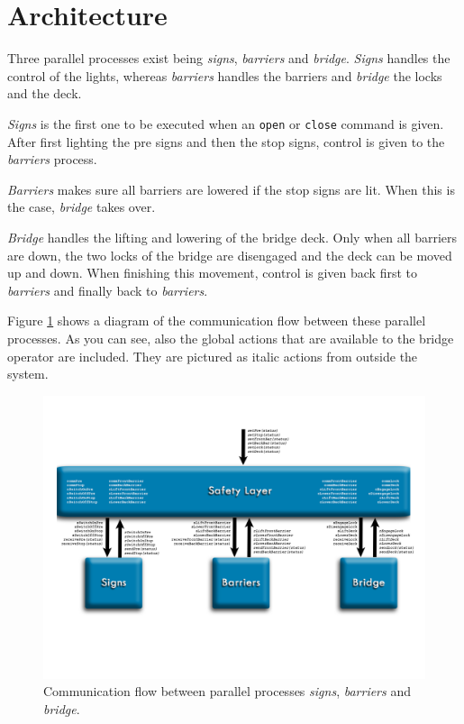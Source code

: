 \newpage
\section{Architecture}
\label{sec:arch}

Three parallel processes exist being \emph{signs}, \emph{barriers} and \emph{bridge}. \emph{Signs} handles the control of the lights, whereas \emph{barriers} handles the barriers and \emph{bridge} the locks and the deck.

\emph{Signs} is the first one to be executed when an \texttt{open} or \texttt{close} command is given. After first lighting the pre signs and then the stop signs, control is given to the \emph{barriers} process.

\emph{Barriers} makes sure all barriers are lowered if the stop signs are lit. When this is the case, \emph{bridge} takes over.

\emph{Bridge} handles the lifting and lowering of the bridge deck. Only when all barriers are down, the two locks of the bridge are disengaged and the deck can be moved up and down. When finishing this movement, control is given back first to \emph{barriers} and finally back to \emph{barriers}.

Figure \ref{fig:arch} shows a diagram of the communication flow between these parallel processes. As you can see, also the global actions that are available to the bridge operator are included. They are pictured as italic actions from outside the system.
%
\begin{figure}[htb]%
\centering
\includegraphics[width=\columnwidth]{Images/Architecture_2}%
\caption{Communication flow between parallel processes \emph{signs}, \emph{barriers} and \emph{bridge}.}%
\label{fig:arch}%
\end{figure}
%

\newpage
